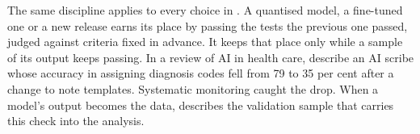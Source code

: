 The same discipline applies to every choice in .
A quantised model, a fine-tuned one or a new release earns its place by passing
the tests the previous one passed, judged against criteria fixed in advance. It
keeps that place only while a sample of its output keeps passing. In a review
of AI in health care, \textcite{salaudeen2026failures} describe an AI scribe
whose accuracy in assigning diagnosis codes fell from 79 to 35 per cent after a
change to note templates. Systematic monitoring caught the drop. When a model's
output becomes the data,  describes the validation
sample that carries this check into the analysis.
